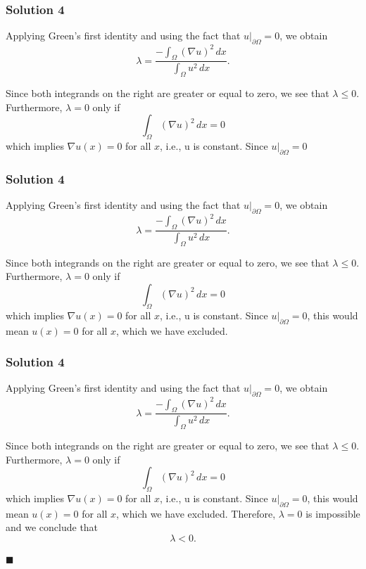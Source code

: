 \documentclass[10pt, t, allowdisplaybreaks]{beamer}
\newcommand{\myqed}{\hfill$\blacksquare$}
\newcommand{\at}[3]{\left.#1\right\vert_{#2}^{#3}}
\begin{document}
\begin{frame}
    \frametitle{Solution 4}
    \par Applying Green's first identity and using the fact that $\at{u}{\partial \Omega}{} = 0$, we obtain
    \begin{equation*}
        \lambda = \frac{-\int_\Omega (\nabla u)^2\,dx}{\int_\Omega u^2\,dx}.
    \end{equation*}

    \par Since both integrands on the right are greater or equal to zero, we see that $\lambda\leq 0$. Furthermore, $\lambda = 0$ only if 
    \begin{equation*}
        \int_\Omega(\nabla u)^2\,dx = 0
    \end{equation*}
    which implies $\nabla u(x) = 0$ for all $x$, i.e., u is constant. Since $\at{u}{\partial \Omega}{} = 0$
\end{frame}
\begin{frame}
    \frametitle{Solution 4}
    \par Applying Green's first identity and using the fact that $\at{u}{\partial \Omega}{} = 0$, we obtain
    \begin{equation*}
        \lambda = \frac{-\int_\Omega (\nabla u)^2\,dx}{\int_\Omega u^2\,dx}.
    \end{equation*}

    \par Since both integrands on the right are greater or equal to zero, we see that $\lambda\leq 0$. Furthermore, $\lambda = 0$ only if 
    \begin{equation*}
        \int_\Omega(\nabla u)^2\,dx = 0
    \end{equation*}
    which implies $\nabla u(x) = 0$ for all $x$, i.e., u is constant. Since $\at{u}{\partial \Omega}{} = 0$, this would mean $u(x) = 0$ for all $x$, which we
    have excluded.
\end{frame}
\begin{frame}
    \frametitle{Solution 4}
    \par Applying Green's first identity and using the fact that $\at{u}{\partial \Omega}{} = 0$, we obtain
    \begin{equation*}
        \lambda = \frac{-\int_\Omega (\nabla u)^2\,dx}{\int_\Omega u^2\,dx}.
    \end{equation*}

    \par Since both integrands on the right are greater or equal to zero, we see that $\lambda\leq 0$. Furthermore, $\lambda = 0$ only if 
    \begin{equation*}
        \int_\Omega(\nabla u)^2\,dx = 0
    \end{equation*}
    which implies $\nabla u(x) = 0$ for all $x$, i.e., u is constant. Since $\at{u}{\partial \Omega}{} = 0$, this would mean $u(x) = 0$ for all $x$, which we
    have excluded. Therefore, $\lambda = 0$ is impossible and we conclude that
    \begin{equation*}
        \lambda < 0.
    \end{equation*}
    
    \myqed

\end{frame}
\end{document}
